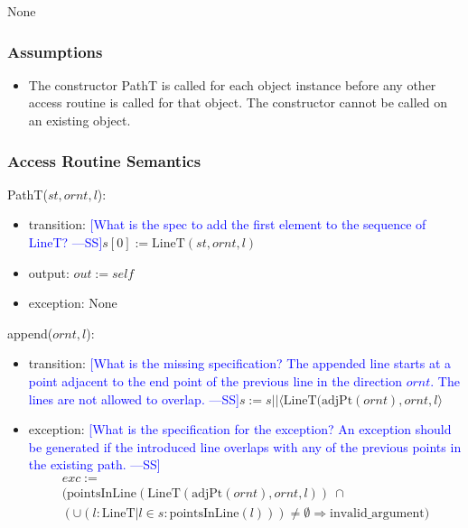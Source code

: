 \documentclass[12pt]{article}
\newcommand{\authornote}[3]{\textcolor{#1}{[#3 ---#2]}}
\newcommand{\authornote}[3]{}
\newcommand{\wss}[1]{\authornote{blue}{SS}{#1}}
\begin{document}
None

\subsubsection* {Assumptions}

\begin{itemize}
\item The constructor PathT is called for each object instance before any other
access routine is called for that object.  The constructor cannot be called on
an existing object.
\end{itemize}

\subsubsection* {Access Routine Semantics}

PathT($st, ornt, l$):
\begin{itemize}
\item transition: \wss{What is the spec to add the first element to the sequence
  of LineT?}$s[0] := \mbox{LineT}(st, ornt, l)$
\item output: $out := \mathit{self}$
\item exception: None
\end{itemize}

\noindent append($ornt, l$):
\begin{itemize}
\item transition: \wss{What is the missing specification?  The appended line
    starts at a point adjacent to the end point of the previous line in the
    direction $ornt$.  The lines are not allowed to
    overlap.}$s := s || \langle \mbox{LineT}(\mbox{adjPt}(ornt), ornt, l\rangle$
\item exception: \wss{What is the specification for the exception?  An exception
    should be generated if the introduced line overlaps with any of the previous
    points in the existing path.}
\begin{multline*}
  exc :=\\
  (\mbox{pointsInLine}(\mbox{LineT}(\mbox{adjPt}(ornt), ornt, l))~\cap~\\ (\cup
  (l: \mbox{LineT} | l \in s : \mbox{pointsInLine}(l))) \neq \emptyset \Rightarrow \mbox{invalid\_argument})
\end{multline*}
\end{itemize}
\end{document}
